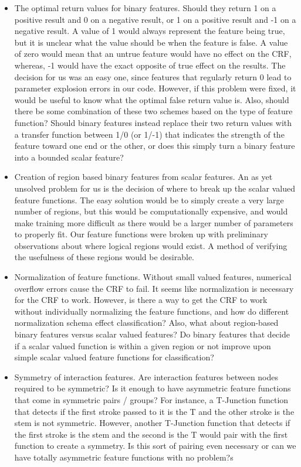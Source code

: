 \documentclass[10pt]{acmsiggraph}               %
\begin{document}
\begin{itemize}
\item The optimal return values for binary features.  Should they return 1 on a positive result and 0 on a negative result, or 1 on a positive result and -1 on a negative result. A value of 1 would always represent the feature being true, but it is unclear what the value should be when the feature is false.  A value of zero would mean that an untrue feature would have no effect on the CRF, whereas, -1 would have the exact opposite of true effect on the results. The decision for us was an easy one, since features that regularly return 0 lead to parameter explosion errors in our code. However, if this problem were fixed, it would be useful to know what the optimal false return value is. Also, should there be some combination of these two schemes based on the type of feature function?  Should binary features instead replace their two return values with a transfer function between 1/0 (or 1/-1) that indicates the strength of the feature toward one end or the other, or does this simply turn a binary feature into a bounded scalar feature?

\item Creation of region based binary features from scalar features.  An as yet unsolved problem for us is the decision of where to break up the scalar valued feature functions. The easy solution would be to simply create a very large number of regions, but this would be computationally expensive, and would make training more difficult as there would be a larger number of parameters to properly fit. Our feature functions were broken up with preliminary observations about where logical regions would exist. A method of verifying the usefulness of these regions would be desirable.

\item Normalization of feature functions.  Without small valued features, numerical overflow errors cause the CRF to fail.  It seems like normalization is necessary for the CRF to work. However, is there a way to get the CRF to work without individually normalizing the feature functions, and how do different normalization schema effect classification? Also, what about region-based binary features versus scalar valued features? Do binary features that decide if a scalar valued function is within a given region or not improve upon simple scalar valued feature functions for classification?

\item Symmetry of interaction features.  Are interaction features between nodes required to be symmetric?  Is it enough to have asymmetric feature functions
that come in symmetric pairs / groups?  For instance, a T-Junction function that detects if the first stroke passed to it is the T and the other stroke is the stem is not symmetric.  However, another T-Junction function that detects if the first stroke is the stem and the second is the T would pair with the first function to create a symmetry.  Is this sort of pairing even necessary or can we have totally asymmetric feature functions with no problem?s


\end{itemize}
\end{document}
